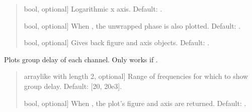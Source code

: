 \documentclass[letterpaper,10pt,english]{sphinxmanual}
\begin{document}
\begin{fulllineitems}
\begin{fulllineitems}
\begin{quote}
\begin{description}
\begin{description}
\sphinxlineitem{\sphinxstylestrong{logx}}{[}bool, optional{]}
\sphinxAtStartPar
Logarithmic x axis. Default: .

\sphinxlineitem{\sphinxstylestrong{with\_phase}}{[}bool, optional{]}
\sphinxAtStartPar
When , the unwrapped phase is also plotted. Default: .

\sphinxlineitem{\sphinxstylestrong{returns}}{[}bool, optional{]}
\sphinxAtStartPar
Gives back figure and axis objects. Default: .

\end{description}

\begin{description}
\end{description}

\end{description}\end{quote}

\end{fulllineitems}


\begin{fulllineitems}
\label{\detokenize{classes:dsptools.classes.signal_class.Signal.plot_group_delay}}
\pysigstartsignatures
{}
\pysigstopsignatures
\sphinxAtStartPar
Plots group delay of each channel.
Only works if .
\begin{quote}\begin{description}
\begin{description}
\sphinxlineitem{\sphinxstylestrong{range\_hz}}{[}array\sphinxhyphen{}like with length 2, optional{]}
\sphinxAtStartPar
Range of frequencies for which to show group delay.
Default: {[}20, 20e3{]}.

\sphinxlineitem{\sphinxstylestrong{returns}}{[}bool, optional{]}
\sphinxAtStartPar
When , the plot’s figure and axis are returned.
Default: .


\end{description}
\end{description}
\end{quote}
\end{fulllineitems}
\end{fulllineitems}
\end{document}
